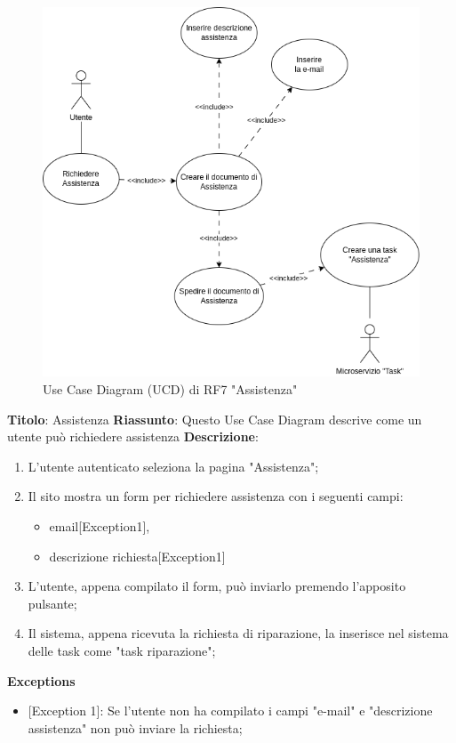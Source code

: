 \documentclass{report}
\begin{document}
\begin{figure}[H]
	\centering\includegraphics[width=1\textwidth]{images/UCD/RF7_assistenza_UCD.png}
	Use Case Diagram (UCD) di RF7 "Assistenza"
\end{figure}
\textbf{Titolo}: Assistenza \newline
\textbf{Riassunto}: Questo Use Case Diagram descrive come un utente può richiedere assistenza  \newline
\textbf{Descrizione}:
	\begin{enumerate}
		\item L'utente autenticato seleziona la pagina "Assistenza";
		\item Il sito mostra un form per richiedere assistenza con i seguenti campi:
		\begin{itemize}
			\item email[Exception1],
			\item descrizione richiesta[Exception1]
		\end{itemize}
		\item L'utente, appena compilato il form, può inviarlo premendo l'apposito pulsante;
		\item Il sistema, appena ricevuta la richiesta di riparazione, la inserisce nel sistema delle task come "task riparazione";
		
	\end{enumerate}
\textbf{Exceptions}
\begin{itemize}
	\item {[Exception 1]}: Se l'utente non ha compilato i campi "e-mail" e "descrizione assistenza" non può inviare la richiesta;
\end{itemize}
\end{document}
